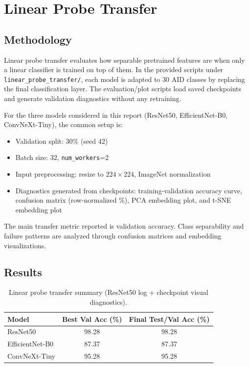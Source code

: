 \documentclass[11pt,a4paper]{article}
\begin{document}
\section{Linear Probe Transfer}
\subsection{Methodology}
Linear probe transfer evaluates how separable pretrained features are when only a linear classifier is trained on top of them. In the provided scripts under \texttt{linear\_probe\_transfer/}, each model is adapted to 30 AID classes by replacing the final classification layer. The evaluation/plot scripts load saved checkpoints and generate validation diagnostics without any retraining.

For the three models considered in this report (ResNet50, EfficientNet-B0, ConvNeXt-Tiny), the common setup is:
\begin{itemize}
	\item Validation split: $30\%$ (seed 42)
	\item Batch size: 32, \texttt{num\_workers}=2
	\item Input preprocessing: resize to $224\times224$, ImageNet normalization
	\item Diagnostics generated from checkpoints: training-validation accuracy curve, confusion matrix (row-normalized \%), PCA embedding plot, and t-SNE embedding plot
\end{itemize}

The main transfer metric reported is validation accuracy. Class separability and failure patterns are analyzed through confusion matrices and embedding visualizations.

\subsection{Results}
\begin{table}[H]
	\centering
	\caption{Linear probe transfer summary (ResNet50 log + checkpoint visual diagnostics).}
	\begin{tabular}{lcc}
		\toprule
		Model & Best Val Acc (\%) & Final Test/Val Acc (\%) \\
		\midrule
		ResNet50 & 98.28 & 98.28 \\
		EfficientNet-B0 & 87.37 & 87.37 \\
		ConvNeXt-Tiny & 95.28 & 95.28 \\
		\bottomrule
	\end{tabular}
\end{table}
\end{document}
